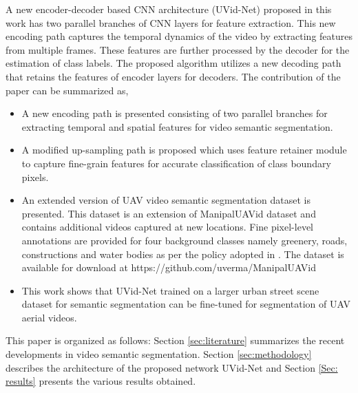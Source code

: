 \documentclass[journal]{IEEEtran}
\begin{document}
\par A new encoder-decoder based CNN architecture (UVid-Net) proposed in this work has two parallel branches of CNN layers for feature extraction. This new encoding path captures the temporal dynamics of the video by extracting features from multiple frames.  These features are further processed by the decoder for the estimation of class labels. The proposed algorithm utilizes a new decoding path that retains the features of encoder layers for decoders. The contribution of the paper can be summarized as,
\begin{itemize}
	\item A new encoding path is presented consisting of two parallel branches for extracting temporal and spatial features for video semantic segmentation. 
\item A modified up-sampling path is proposed which uses feature retainer module to capture fine-grain features for accurate classification of class boundary pixels.
	\item An extended version of UAV video semantic segmentation dataset is presented. This dataset is an extension of ManipalUAVid dataset \cite{19} and contains additional videos captured at new locations. Fine pixel-level annotations are provided for four background classes namely greenery, roads, constructions and water bodies as per the policy adopted in \cite{19}. The dataset is available for download at https://github.com/uverma/ManipalUAVid 
	\item This work shows that UVid-Net trained on a larger urban street scene dataset for semantic segmentation can be fine-tuned for segmentation of UAV aerial videos. 
	
\end{itemize}

\par This paper is organized as follows: Section \ref{sec:literature} summarizes the recent developments in video semantic segmentation. Section \ref{sec:methodology} describes the architecture of the proposed network UVid-Net and Section \ref{Sec: results} presents the various results obtained. 
\end{document}
